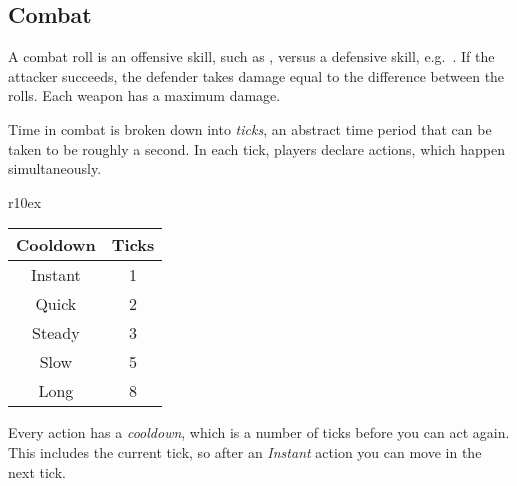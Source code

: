 
\subsection{Combat}
A combat roll is an offensive skill, such as , versus a defensive skill, e.g.\ . If the attacker succeeds, the defender takes damage equal to the difference between the rolls. Each weapon has a maximum damage.

Time in combat is broken down into \emph{ticks}, an abstract time period that can be taken to be roughly a second. In each tick, players declare actions, which happen simultaneously.

\begin{wraptable}[5]{r}{10ex}
  \small
\vspace*{-4ex}
\hspace*{-4.5ex}
\begin{tabular}{cc}
  Cooldown & Ticks \\
  \hline
  Instant  & 1     \\
  Quick    & 2     \\
  Steady   & 3     \\
  Slow     & 5     \\
  Long     & 8
\end{tabular}
\end{wraptable}

Every action has a \emph{cooldown}, which is a number of ticks before you can act again. This includes the current tick, so after an \emph{Instant} action you can move in the next tick.
